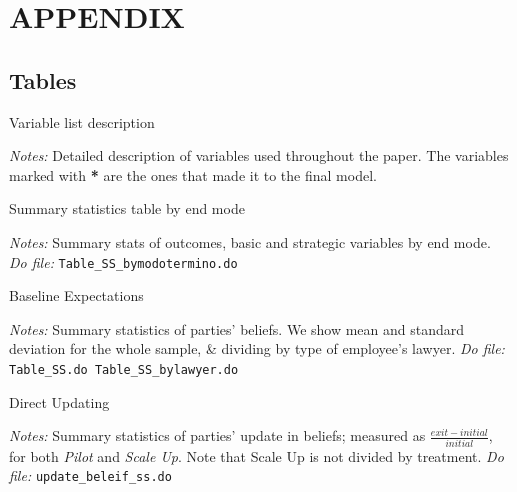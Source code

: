 \documentclass[11pt]{article}
\begin{document}


\section{APPENDIX}

\subsection{Tables}



\begin{table}[H]
    \caption{Variable list description }
    \label{tab:SS}
    \begin{center}
        \scriptsize{}
    \end{center}
    \footnotesize
    \textit{Notes:} 
Detailed description of variables used throughout the paper. The variables marked with \textbf{*} are the ones that made it to the final model.
\end{table}

\begin{table}[H]
    \caption{Summary statistics table by end mode }
    \label{tab:SS}
    \begin{center}
        \tiny{}
    \end{center}
    \footnotesize
    \textit{Notes:} 
Summary stats of outcomes, basic and strategic variables by end mode.
    \textit{Do file: } \texttt{Table\_SS\_bymodotermino.do}
\end{table}

\begin{table}[H]
    \caption{Baseline Expectations}
    \label{Table_expectations}
    \begin{center}
       \scriptsize{}
    \end{center}
    \footnotesize    
    \textit{Notes:} 
    Summary statistics of parties' beliefs. We show mean and standard deviation for the whole sample, \& dividing by type of employee's lawyer.
    \textit{Do file: } \texttt{Table\_SS.do  Table\_SS\_bylawyer.do}
\end{table}


    
\begin{table}[H]
    \caption{Direct Updating}
     \begin{center}
       \scriptsize{}
    \end{center}
           \footnotesize    
  \textit{Notes:} 
    Summary statistics of parties' update in beliefs; measured as $\frac{exit-initial}{initial}$, for both \emph{Pilot} and \emph{Scale Up}. Note that Scale Up is not divided by treatment. 
    \textit{Do file: } \texttt{update\_beleif\_ss.do}
\end{table}
\end{document}
